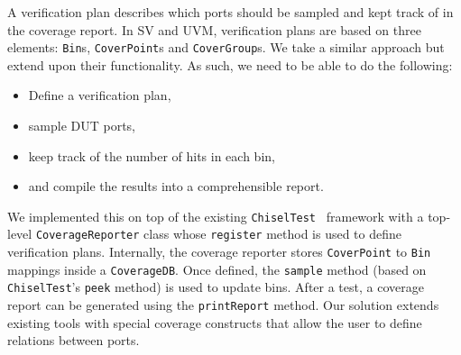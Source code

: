 \documentclass[conference]{IEEEtran}
\begin{document}
A verification plan describes which ports should be sampled and kept track of in the coverage report. In SV and UVM, verification plans are based on three elements: \texttt{Bin}s, \texttt{CoverPoint}s and \texttt{CoverGroup}s. We take a similar approach but extend upon their functionality. As such, we need to be able to do the following: %
\begin{itemize}
\item Define a verification plan, %
\item sample DUT ports,%
\item keep track of the number of hits in each bin,%
\item and compile the results into a comprehensible report.%
\end{itemize}

We implemented this on top of the existing \texttt{ChiselTest}~\cite{chisel:tester2} framework with a top-level \texttt{CoverageReporter} class whose \texttt{register} method is used to define verification plans. Internally, the coverage reporter stores \texttt{CoverPoint} to \texttt{Bin} mappings inside a \texttt{CoverageDB}. Once defined, the \texttt{sample} method (based on \texttt{ChiselTest}'s \texttt{peek} method) is used to update bins. After a test, a coverage report can be generated using the \texttt{printReport} method. Our solution extends existing tools with special coverage constructs that allow the user to define relations between ports. %
\end{document}
